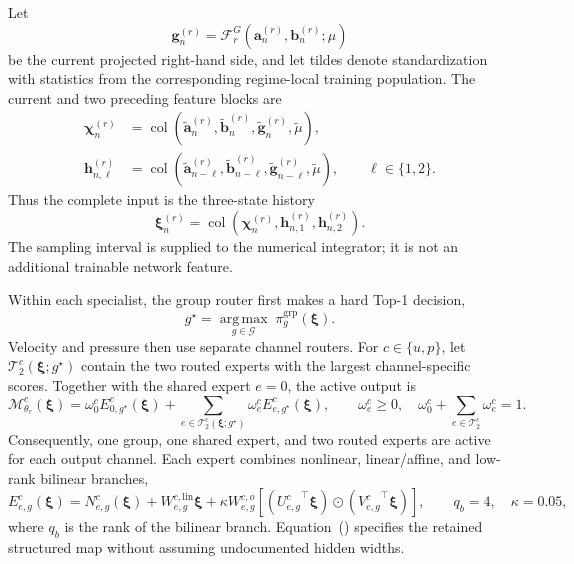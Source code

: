 Let
\begin{equation}
  \bm g_n^{(r)}
  =\mathcal F_r^G\!\left(
      \bm a_n^{(r)},\bm b_n^{(r)};\mu
    \right)
  \label{eq:app_galerkin_feature}
\end{equation}
be the current projected right-hand side, and let tildes denote
standardization with statistics from the corresponding regime-local training
population. The current and two preceding feature blocks are
\begin{align}
  \bm\chi_n^{(r)}
  &=\operatorname{col}\!\left(
      \widetilde{\bm a}_n^{(r)},
      \widetilde{\bm b}_n^{(r)},
      \widetilde{\bm g}_n^{(r)},
      \widetilde\mu
    \right),
  \label{eq:app_current_feature_block}\\
  \bm h_{n,\ell}^{(r)}
  &=\operatorname{col}\!\left(
      \widetilde{\bm a}_{n-\ell}^{(r)},
      \widetilde{\bm b}_{n-\ell}^{(r)},
      \widetilde{\bm g}_{n-\ell}^{(r)},
      \widetilde\mu
    \right),
  \qquad \ell\in\{1,2\}.
  \label{eq:app_history_feature_blocks}
\end{align}
Thus the complete input is the three-state history
\begin{equation}
  \bm\xi_n^{(r)}
  =\operatorname{col}\!\left(
      \bm\chi_n^{(r)},\bm h_{n,1}^{(r)},\bm h_{n,2}^{(r)}
    \right).
  \label{eq:app_specialist_features}
\end{equation}
The sampling interval is supplied to the numerical integrator; it is not an
additional trainable network feature.

Within each specialist, the group router first makes a hard Top-1 decision,
\begin{equation}
  g^\star
  =\underset{g\in\mathcal G}{\operatorname{arg\,max}}
    \;\pi_g^{\mathrm{grp}}(\bm\xi).
  \label{eq:app_group_top1}
\end{equation}
Velocity and pressure then use separate channel routers. For
$c\in\{u,p\}$, let $\mathcal T_2^c(\bm\xi;g^\star)$ contain the two routed
experts with the largest channel-specific scores. Together with the shared
expert $e=0$, the active output is
\begin{equation}
  \mathcal M^c_{\theta_r}(\bm\xi)
  =\omega_0^c E^c_{0,g^\star}(\bm\xi)
  +\sum_{e\in\mathcal T_2^c(\bm\xi;g^\star)}
     \omega_e^c E^c_{e,g^\star}(\bm\xi),
  \qquad
  \omega_e^c\geq0,
  \quad
  \omega_0^c+\sum_{e\in\mathcal T_2^c}\omega_e^c=1.
  \label{eq:app_channel_sparse_moe}
\end{equation}
Consequently, one group, one shared expert, and two routed experts are active
for each output channel. Each expert combines nonlinear, linear/affine, and
low-rank bilinear branches,
\begin{equation}
  E^c_{e,g}(\bm\xi)
  =N^c_{e,g}(\bm\xi)
   +W^{c,\mathrm{lin}}_{e,g}\bm\xi
   +\kappa W^{c,o}_{e,g}
    \left[
      \left({U^c_{e,g}}^\top\bm\xi\right)
      \odot
      \left({V^c_{e,g}}^\top\bm\xi\right)
    \right],
  \qquad q_b=4,\quad \kappa=0.05,
  \label{eq:app_structured_expert}
\end{equation}
where $q_b$ is the rank of the bilinear branch. Equation~()
specifies the retained structured map without
assuming undocumented hidden widths.

